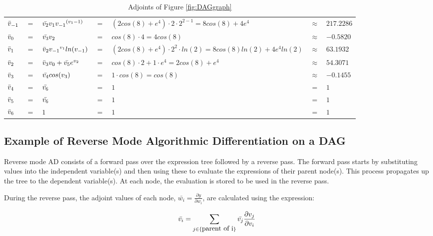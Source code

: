 \documentclass{article}
\begin{document}
\begin{table}[h!]
    \centering
    \begin{tabular}{|lclllll|}
        \hline
        $\Bar{v}_{-1}$ & $=$ & $\Bar{v_2}v_1 {v_{-1}}^{(v_{1}-1)}$ & $=$ & $(2cos(8)+e^4) \cdot 2 \cdot 2^{2-1} = 8cos(8)+4e^4$ & $\approx$ & $217.2286$\\
        $\Bar{v}_{0}$ & $=$ & $\Bar{v_3}v_2$ & $=$ & $cos(8)\cdot4 = 4cos(8)$ & $\approx$ & $-0.5820$\\
        \hline
        $\Bar{v}_{1}$ & $=$ & $\Bar{v}_{2}{v_{-1}}^{v_{1}}ln(v_{-1})$ & $=$ & $(2cos(8)+e^4) \cdot 2^2 \cdot ln(2) = 8cos(8)ln(2) +4e^4ln(2)$ & $\approx$ & $63.1932$\\
        $\Bar{v}_{2}$ & $=$ & $\Bar{v}_{3}v_0 + \Bar{v_5}e^{v_2}$ & $=$ & $cos(8) \cdot 2 + 1 \cdot e^{4} = 2cos(8)+e^4$ & $\approx$ & $54.3071$\\
        $\Bar{v}_{3}$ & $=$ & $\Bar{v_4}cos(v_3)$ & $=$ & $1 \cdot cos(8) = cos(8)$ & $\approx$ & $-0.1455$\\
        $\Bar{v}_{4}$ & $=$ & $\Bar{v_6}$ & $=$ & $1$ & $=$ & $1$\\
        $\Bar{v}_{5}$ & $=$ & $\Bar{v_6}$ & $=$ & $1$ & $=$ & $1$\\
        \hline
        $\Bar{v}_{6}$ & $=$ & $1$ & $=$ & $1$ & $=$ & $1$\\
        \hline
    \end{tabular}
    \caption{Adjoints of Figure \ref{fig:DAGgraph}}
    \label{tab:example1RM}
\end{table}

\subsection{Example of Reverse Mode Algorithmic Differentiation on a DAG}



Reverse mode AD consists of a forward pass over the expression tree followed by a reverse pass. The forward pass starts by substituting values into the independent variable(s) and then using these to evaluate the expressions of their parent node(s). This process propagates up the tree to the dependent variable(s). At each node, the evaluation is stored to be used in the reverse pass.

During the reverse pass, the adjoint values of each node, $\bar{w_i} = \frac{\partial{y}}{\partial{w_i}}$, are calculated using the expression:

\begin{equation}
\Bar{v_i} = \sum_{j\in\{\mbox{parent of i}\}} \Bar{v_j}\frac{\partial{v_j}}{\partial{v_i}}
\end{equation}
\end{document}
